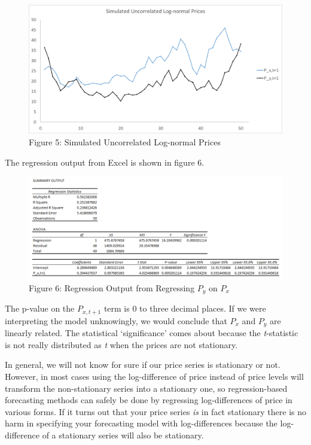 \documentclass[]{book}
\theoremstyle{definition}
\theoremstyle{definition}
\theoremstyle{remark}
\begin{document}
\begin{figure}[htbp]
\centering
\includegraphics{Excel-files/BasicStatisticsand-MT_Cars_Regression_files/image017.png}
\caption{Figure 5: Simulated Uncorrelated Log-normal Prices}
\end{figure}

The regression output from Excel is shown in figure 6.

\begin{figure}[htbp]
\centering
\includegraphics{images/spurious_res.png}
\caption{Figure 6: Regression Output from Regressing \(P_y\) on \(P_x\)}
\end{figure}

The p-value on the \(P_{x,t+1}\) term is 0 to three decimal places. If
we were interpreting the model unknowingly, we would conclude that
\(P_x\) and \(P_y\) are linearly related. The statistical `significance'
comes about because the \emph{t}-statistic is not really distributed as
\emph{t} when the prices are not stationary.

In general, we will not know for sure if our price series is stationary
or not. However, in most cases using the log-difference of price instead
of price levels will transform the non-stationary series into a
stationary one, so regression-based forecasting methods can safely be
done by regressing log-differences of price in various forms. If it
turns out that your price series \emph{is} in fact stationary there is
no harm in specifying your forecasting model with log-differences
because the log-difference of a stationary series will also be
stationary.
\end{document}
